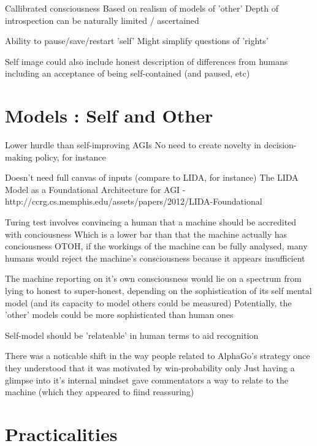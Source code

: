 \documentclass[citeauthoryear]{llncs}
\begin{document}
Callibrated consciousness
  Based on realism of models of 'other'
  Depth of introspection can be naturally limited / ascertained
  
  Ability to pause/save/restart 'self'
  Might simplify questions of 'rights'


Self image could also include honest description of differences from humans
  including an acceptance of being self-contained (and paused, etc)


\section{Models : Self and Other}


Lower hurdle than self-improving AGIs
  No need to create novelty in decision-making policy, for instance
  
Doesn't need full canvas of inputs (compare to LIDA, for instance)
  The LIDA Model as a Foundational Architecture for AGI - http://ccrg.cs.memphis.edu/assets/papers/2012/LIDA-Foundational%



Turing test involves convincing a human that a machine should be accredited with conciousness
  Which is a lower bar than that the machine actually has conciousness
  OTOH, if the workings of the machine can be fully analysed, many humans would reject the machine's consciousness because it appears insufficient

The machine reporting on it's own consciousness would lie on a spectrum from lying to honest to super-honest, 
  depending on the sophistication of its self mental model (and its capacity to model others could be measured)
  Potentially, the 'other' models could be more sophisticated than human ones
  
Self-model should be 'relateable' in human terms to aid recognition 
  
  There was a noticable shift in the way people related to AlphaGo's strategy once they understood that it was motivated by win-probability only
    Just having a glimpse into it's internal mindset gave commentators a way to relate to the machine (which they appeared to fiind reassuring)
    


\section{Practicalities}


\end{document}
